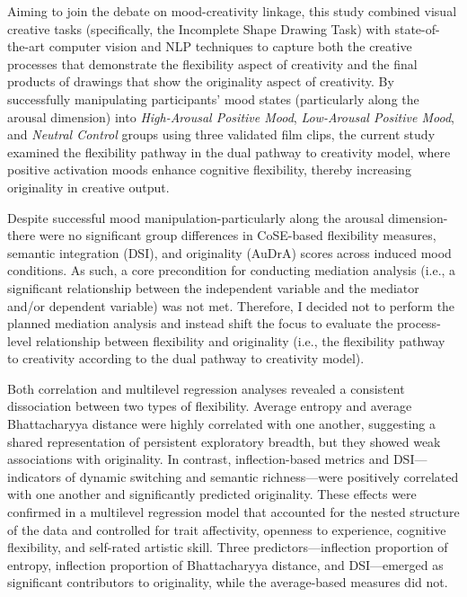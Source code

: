 \documentclass[../MA_Thesis.tex]{subfiles}
\begin{document}
Aiming to join the debate on mood-creativity linkage, this study combined visual creative tasks (specifically, the Incomplete Shape Drawing Task) with state-of-the-art computer vision and NLP techniques to capture both the creative processes that demonstrate the flexibility aspect of creativity and the final products of drawings that show the originality aspect of creativity. By successfully manipulating participants’ mood states (particularly along the arousal dimension) into \textit{High-Arousal Positive Mood}, \textit{Low-Arousal Positive Mood}, and \textit{Neutral Control} groups using three validated film clips, the current study examined the flexibility pathway in the dual pathway to creativity model, where positive activation moods enhance cognitive flexibility, thereby increasing originality in creative output.

Despite successful mood manipulation-particularly along the arousal dimension-there were no significant group differences in CoSE-based flexibility measures, semantic integration (DSI), and originality (AuDrA) scores across induced mood conditions. As such, a core precondition for conducting mediation analysis (i.e., a significant relationship between the independent variable and the mediator and/or dependent variable) was not met. Therefore, I decided not to perform the planned mediation analysis and instead shift the focus to evaluate the process-level relationship between flexibility and originality (i.e., the flexibility pathway to creativity according to the dual pathway to creativity model). 

Both correlation and multilevel regression analyses revealed a consistent dissociation between two types of flexibility. Average entropy and average Bhattacharyya distance were highly correlated with one another, suggesting a shared representation of persistent exploratory breadth, but they showed weak associations with originality. In contrast, inflection-based metrics and DSI—indicators of dynamic switching and semantic richness—were positively correlated with one another and significantly predicted originality. These effects were confirmed in a multilevel regression model that accounted for the nested structure of the data and controlled for trait affectivity, openness to experience, cognitive flexibility, and self-rated artistic skill. Three predictors—inflection proportion of entropy, inflection proportion of Bhattacharyya distance, and DSI—emerged as significant contributors to originality, while the average-based measures did not.  
\end{document}
